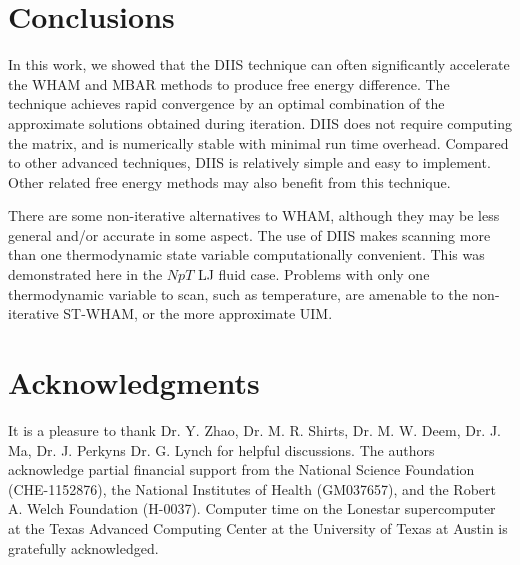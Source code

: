 \documentclass[reprint,aip,jcp,superscriptaddress]{revtex4-1}
\begin{document}
\section{Conclusions}



In this work, we showed that the DIIS technique
can often significantly accelerate
the WHAM and MBAR methods to produce free energy difference.
%
The technique achieves rapid convergence
by an optimal combination of the approximate
solutions obtained during iteration.
%
DIIS does not require computing
the  matrix,
and is numerically stable
with minimal run time overhead.
%
Compared to other advanced techniques\cite{
shirts2008, zhu2012},
DIIS is relatively simple and easy to implement.
%
Other related free energy methods\cite{
shen1991, woolf1994, *crouzy1994, roux1995}
may also benefit from this technique.
%



There are some non-iterative alternatives to WHAM,
although they may be less general and/or accurate
in some aspect.
%
The use of DIIS makes scanning more than one thermodynamic state variable
computationally convenient.
%
This was demonstrated here in the $NpT$ LJ fluid case.
%
Problems with only one thermodynamic variable to scan, such as temperature,
are amenable to the non-iterative ST-WHAM,
or the more approximate UIM.
%




\section{Acknowledgments}





It is a pleasure to thank
Dr. Y. Zhao,
Dr. M. R. Shirts,
Dr. M. W. Deem,
Dr. J. Ma,
Dr. J. Perkyns Dr. G. Lynch
for helpful discussions.
%
The authors acknowledge
partial financial support from
the National Science Foundation (CHE-1152876),
the National Institutes of Health (GM037657),
and
the Robert A. Welch Foundation (H-0037).
%
Computer time on the Lonestar supercomputer
at the Texas Advanced Computing Center
at the University of Texas at Austin
is gratefully acknowledged.
\end{document}

